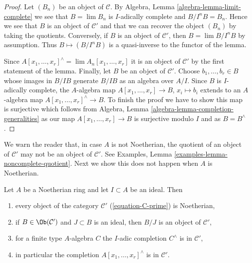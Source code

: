 \begin{proof}
Let $(B_n)$ be an object of $\mathcal{C}$. By
Algebra, Lemma \ref{algebra-lemma-limit-complete}
we see that $B = \lim B_n$ is $I$-adically complete
and $B/I^nB = B_n$. Hence we see that $B$ is an object of
$\mathcal{C}'$ and that we can recover the object $(B_n)$ 
by taking the quotients.
Conversely, if $B$ is an object of $\mathcal{C}'$, then
$B = \lim B/I^nB$ by assumption. Thus $B \mapsto (B/I^nB)$ is a quasi-inverse
to the functor of the lemma.

\medskip\noindent
Since $A[x_1, \ldots, x_r]^\wedge = \lim A_n[x_1, \ldots, x_r]$
it is an object of $\mathcal{C}'$ by the first statement of the lemma.
Finally, let $B$ be an object of $\mathcal{C}'$. Choose
$b_1, \ldots, b_r \in B$ whose images in $B/IB$ generate
$B/IB$ as an algebra over $A/I$. Since $B$ is $I$-adically
complete, the $A$-algebra map $A[x_1, \ldots, x_r] \to B$, $x_i \mapsto b_i$
extends to an $A$-algebra map $A[x_1, \ldots, x_r]^\wedge \to B$.
To finish the proof we have to show this map is surjective
which follows from Algebra, Lemma \ref{algebra-lemma-completion-generalities}
as our map $A[x_1, \ldots, x_r] \to B$ is surjective modulo $I$
and as $B = B^\wedge$.
\end{proof}

\noindent
We warn the reader that, in case $A$ is not Noetherian, the
quotient of an object of $\mathcal{C}'$ may not be an object
of $\mathcal{C}'$. See Examples, Lemma
\ref{examples-lemma-noncomplete-quotient}.
Next we show this does not happen when $A$ is Noetherian.

\begin{lemma}
\label{lemma-topologically-finite-type-Noetherian}
\begin{reference}
\cite[Proposition 7.5.5]{EGA1}
\end{reference}
Let $A$ be a Noetherian ring and let $I \subset A$ be an ideal. Then
\begin{enumerate}
\item every object of the category $\mathcal{C}'$
(\ref{equation-C-prime}) is Noetherian,
\item if $B \in \Ob(\mathcal{C}')$ and $J \subset B$ is an ideal,
then $B/J$ is an object of $\mathcal{C}'$,
\item for a finite type $A$-algebra $C$ the $I$-adic completion
$C^\wedge$ is in $\mathcal{C}'$,
\item in particular the completion $A[x_1, \ldots, x_r]^\wedge$
is in $\mathcal{C}'$.
\end{enumerate}
\end{lemma}

